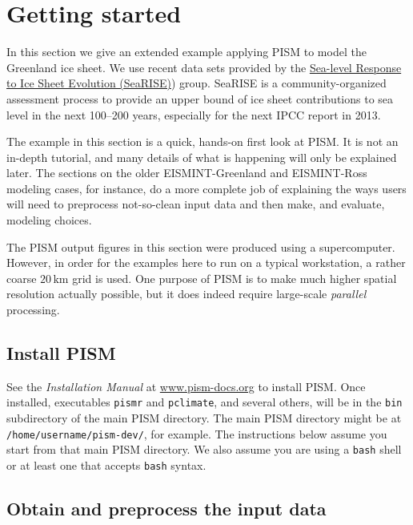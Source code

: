 
\section{Getting started}\label{sect:start}

In this section we give an extended example applying PISM to model the Greenland ice sheet.  We use recent data sets provided by the \href{http://websrv.cs.umt.edu/isis/index.php/SeaRISE_Assessment}{Sea-level Response to Ice Sheet Evolution (SeaRISE)}) group.  SeaRISE is a community-organized assessment process to provide an upper bound of ice sheet contributions to sea level in the next 100--200 years, especially for the next IPCC report in 2013.

The example in this section is a quick, hands-on first look at PISM.  It is not an in-depth tutorial, and many details of what is happening will only be explained later.  The sections on the older EISMINT-Greenland and EISMINT-Ross modeling cases, for instance, do a more complete job of explaining the ways users will need to preprocess not-so-clean input data and then make, and evaluate, modeling choices.

The PISM output figures in this section were produced using a supercomputer.  However, in order for the examples here to run on a typical workstation, a rather coarse $20\,\textrm{km}$ grid is used.  One purpose of PISM is to make much higher spatial resolution actually possible, but it does indeed require large-scale \emph{parallel} processing.


\subsection{Install PISM}

See the \emph{Installation Manual} at \href{http://www.pism-docs.org}{www.pism-docs.org}
to install PISM.  Once installed, executables \texttt{pismr} and \texttt{pclimate}, and several others, will be in the \texttt{bin} subdirectory of the main PISM directory.  The main PISM directory might be at \texttt{/home/username/pism-dev/}, for example.  The instructions below assume you start from that main PISM directory.  We also assume you are using a \texttt{bash} shell or at least one that accepts \texttt{bash} syntax.


\subsection{Obtain and preprocess the input data}

